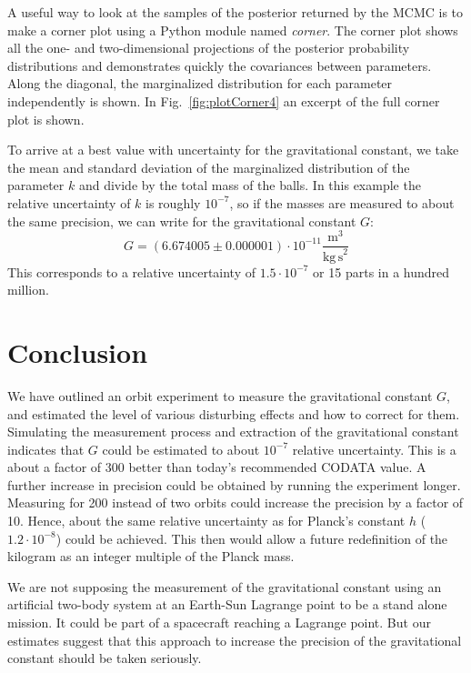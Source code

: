 \documentclass[prb,preprint]{revtex4-1}
\begin{document}
A useful way to look at the samples of the posterior returned by the MCMC is to make a corner plot using a Python module named \textit{corner}.\cite{corner} The corner plot shows all the one- and two-dimensional projections of the posterior probability distributions and demonstrates quickly the covariances between parameters. Along the diagonal, the marginalized distribution for each parameter independently is shown.
In Fig.~\ref{fig:plotCorner4} an excerpt of the full corner plot is shown. 

To arrive at a best value with uncertainty for the gravitational constant, we take the mean and standard deviation of the marginalized distribution of the parameter $k$ and divide by the total mass of the balls. In this example the relative uncertainty of $k$ is roughly $10^{-7}$, so if the masses are measured to about the same precision, we can write for the gravitational constant $G$:
\begin{equation}\label{Gfit}
G = \left(6.674005 \pm 0.000001 \right) \cdot 10^{-11}  \frac{\mathrm{m}^3}{\mathrm{kg \, s}^2}
\end{equation}
This corresponds to a relative uncertainty of $1.5 \cdot 10^{-7}$ or 15 parts in a hundred million.

\section{Conclusion}
We have outlined an orbit experiment to measure the gravitational
constant $G$, and estimated the level of various disturbing effects
and how to correct for them.  Simulating the measurement process and
extraction of the gravitational constant indicates that $G$ could be
estimated to about $10^{-7}$ relative uncertainty.  This is a about a
factor of 300 better than today's recommended CODATA value. A further increase in precision could be obtained by running the experiment longer. Measuring for 200 instead of two orbits could increase the precision by a factor of 10.
Hence, about the same relative uncertainty as for Planck's constant
$h$ ($1.2 \cdot 10^{-8}$)\cite{CODATA16} could be achieved. This then
would allow a future redefinition of the kilogram as an integer
multiple of the Planck mass.

We are not supposing the measurement of the gravitational constant 
using an artificial two-body system at an Earth-Sun Lagrange point to be a stand alone mission. It could be part of 
a spacecraft reaching a Lagrange point. But our estimates suggest that this approach to increase the precision of the gravitational constant should be taken seriously. 
\end{document}
